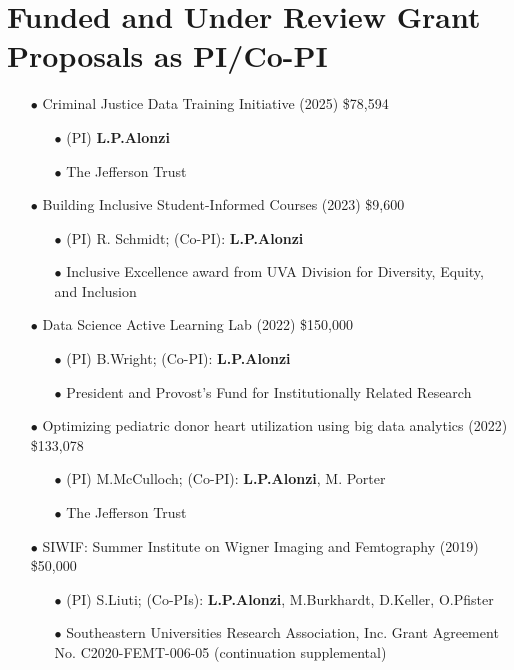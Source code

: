 \documentclass{article}[10pt]
\begin{document}
\section*{Funded and Under Review Grant Proposals as PI/Co-PI}
\begin{itemize}

\item[$\bullet$] Criminal Justice Data Training Initiative (2025) \$78,594 
\begin{itemize}
\item[$\bullet$] (PI) {\bf L.P.Alonzi}
\item[$\bullet$] The Jefferson Trust
\end{itemize}


\item[$\bullet$] Building Inclusive Student-Informed Courses (2023) \$9,600
\begin{itemize}
\item[$\bullet$] (PI) R. Schmidt; (Co-PI): {\bf L.P.Alonzi}
\item[$\bullet$] Inclusive Excellence award from UVA Division for Diversity, Equity, and Inclusion
\end{itemize}
\item[$\bullet$] Data Science Active Learning Lab (2022) \$150,000
\begin{itemize}
\item[$\bullet$] (PI) B.Wright; (Co-PI): {\bf L.P.Alonzi}
\item[$\bullet$] President and Provost’s Fund for Institutionally Related Research
\end{itemize}
\item[$\bullet$] Optimizing pediatric donor heart utilization using big data analytics (2022) \$133,078
\begin{itemize}
\item[$\bullet$] (PI) M.McCulloch; (Co-PI): {\bf L.P.Alonzi}, M. Porter
\item[$\bullet$] The Jefferson Trust
\end{itemize}
\item[$\bullet$] SIWIF: Summer Institute on Wigner Imaging and Femtography (2019) \$50,000
\begin{itemize}
\item[$\bullet$] (PI) S.Liuti; (Co-PIs): {\bf L.P.Alonzi}, M.Burkhardt, D.Keller, O.Pfister
\item[$\bullet$] Southeastern Universities Research Association, Inc. Grant Agreement No. C2020-FEMT-006-05 (continuation supplemental)
\end{itemize}

\end{itemize}
\end{document}
